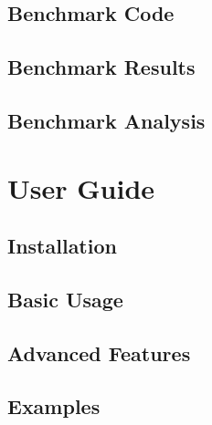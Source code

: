 \subsection{Benchmark Code}

\subsection{Benchmark Results}

\subsection{Benchmark Analysis}

\section{User Guide}

\subsection{Installation}

\subsection{Basic Usage}

\subsection{Advanced Features}

\subsection{Examples} 